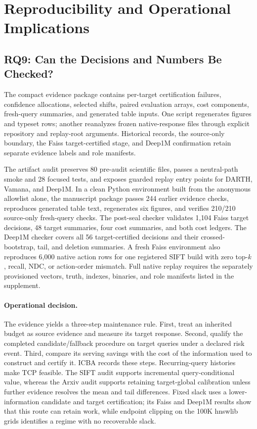 \section{Reproducibility and Operational Implications}
\label{sec:discussion}

\subsection{RQ9: Can the Decisions and Numbers Be Checked?}
The compact evidence package contains per-target certification failures, confidence allocations, selected shifts, paired evaluation arrays, cost components, fresh-query summaries, and generated table inputs. One script regenerates figures and typeset rows; another reanalyzes frozen native-response files through explicit repository and replay-root arguments. Historical records, the source-only boundary, the Faiss target-certified stage, and Deep1M confirmation retain separate evidence labels and role manifests.

The artifact audit preserves 80 pre-audit scientific files, passes a neutral-path smoke and 28 focused tests, and exposes guarded replay entry points for DARTH, Vamana, and Deep1M. In a clean Python environment built from the anonymous allowlist alone, the manuscript package passes 244 earlier evidence checks, reproduces generated table text, regenerates six figures, and verifies 210/210 source-only fresh-query checks. The post-seal checker validates 1,104 Faiss target decisions, 48 target summaries, four cost summaries, and both cost ledgers. The Deep1M checker covers all 56 target-certified decisions and their crossed-bootstrap, tail, and deletion summaries. A fresh Faiss environment also reproduces 6,000 native action rows for one registered SIFT build with zero top-$k$, recall, NDC, or action-order mismatch. Full native replay requires the separately provisioned vectors, truth, indexes, binaries, and role manifests listed in the supplement.

\paragraph{Operational decision.}
The evidence yields a three-step maintenance rule. First, treat an inherited budget as source evidence and measure its target response. Second, qualify the completed candidate/fallback procedure on target queries under a declared risk event. Third, compare its serving savings with the cost of the information used to construct and certify it. ICBA records these steps. Recurring-query histories make TCP feasible. The SIFT audit supports incremental query-conditional value, whereas the Arxiv audit supports retaining target-global calibration unless further evidence resolves the mean and tail differences. Fixed slack uses a lower-information candidate and target certification; its Faiss and Deep1M results show that this route can retain work, while endpoint clipping on the 100K hnswlib grids identifies a regime with no recoverable slack.

